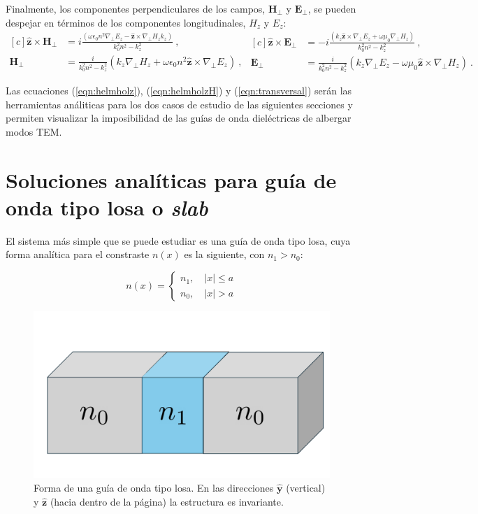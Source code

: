 Finalmente, los componentes perpendiculares de los campos, $\textbf{H}_\perp$ y $\textbf{E}_\perp$, se pueden despejar en términos de los componentes longitudinales, $H_z$ y $E_z$:
\begin{equation}
\begin{aligned}[c]
 \hat{\textbf{z}} \times \textbf{H}_\perp &= i\frac{(\omega\epsilon_0 n^2 \nabla_\perp E_z  - \hat{\textbf{z}} \times \nabla_\perp H_z k_z)}{k_0^2 n^2 - k_z^2} \ ,
 \\
\textbf{H}_\perp &= \frac{i}{k_0^2 n^2 - k_z^2}\left(k_z\nabla_\perp H_z + \omega \epsilon_0 n^2\hat{\textbf{z}} \times \nabla_\perp E_z\right) \ ,
\end{aligned}
\begin{aligned}[c]
	\hat{\textbf{z}} \times \textbf{E}_\perp &= -i\frac{(k_z\hat{\textbf{z}} \times \nabla_\perp E_z + \omega\mu_0 \nabla_\perp H_z)  }{k_0^2 n^2 - k_z^2} \ ,
	\\
\textbf{E}_\perp &= \frac{i}{k_0^2 n^2 - k_z^2}\left(k_z \nabla_\perp E_z - \omega\mu_0 \hat{\textbf{z}} \times \nabla_\perp H_z\right) \ . \label{eqn:transversal}
\end{aligned}
\end{equation}

Las ecuaciones (\ref{eqn:helmholz}), (\ref{eqn:helmholzH}) y (\ref{eqn:transversal}) serán las herramientas análiticas para los dos casos de estudio de las siguientes secciones y permiten visualizar la imposibilidad de las guías de onda dieléctricas de albergar modos TEM.
\section{Soluciones analíticas para guía de onda tipo losa o \textit{slab}}

El sistema más simple que se puede estudiar es una guía de onda tipo losa, cuya forma analítica para el constraste $n(x)$ es la siguiente, con $n_1 > n_0$:

\begin{equation*}
	n(x) = \left\{\begin{matrix}
	n_1, \quad |x| \le a
	\\
	n_0, \quad |x| > a
 	\end{matrix}\right.
\end{equation*}

\begin{figure}[H]
	\centering
	\includegraphics[width=0.6\linewidth]{media/slab.pdf}
	\caption[Forma de una guía de onda tipo losa.]{Forma de una guía de onda tipo losa. En las direcciones $\mathbf{\hat{y}}$ (vertical) y $\mathbf{\hat{z}}$ (hacia dentro de la página) la estructura es invariante.}
\end{figure}

